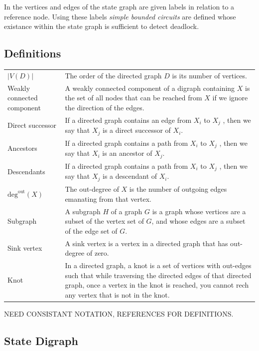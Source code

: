 \documentclass{article}
\begin{document}
In \cite{choetal95} the vertices and edges of the state graph are given labels in relation to a reference node.
Using these labels \textit{simple bounded circuits} are defined whose existance within the state graph is sufficient to detect deadlock.


\subsection{Definitions}

\begin{tabular}{ p{5cm} p{10cm} }
  $\left| V(D) \right|$        & The order of the directed graph $D$ is its number of vertices. \\
  Weakly connected component   & A weakly connected component of a digraph containing $X$ is the set of all nodes that can be reached from $X$ if we ignore the direction of the edges. \\
  Direct successor             & If a directed graph contains an edge from $X_i$ to $X_j$ , then we say that $X_j$ is a direct successor of $X_i$. \\
  Ancestors                    & If a directed graph contains a path from $X_i$ to $X_j$ , then we say that $X_i$ is an ancestor of $X_j$. \\
  Descendants                  & If a directed graph contains a path from $X_i$ to $X_j$ , then we say that $X_j$ is a descendant of $X_i$. \\
  $\text{deg}^{\text{out}}(X)$ & The out-degree of $X$ is the number of outgoing edges emanating from that vertex. \\
  Subgraph                     & A subgraph $H$ of a graph $G$ is a graph whose vertices are a subset of the vertex set of $G$, and whose edges are a subset of the edge set of $G$. \\
  Sink vertex                  & A sink vertex is a vertex in a directed graph that has out-degree of zero.\\
  Knot                         & In a directed graph, a knot is a set of vertices with out-edges such that while traversing the directed edges of that directed graph, once a vertex in the knot is reached, you cannot rech any vertex that is not in the knot.\\
\end{tabular}

NEED CONSISTANT NOTATION, REFERENCES FOR DEFINITIONS.

\subsection{State Digraph}
\end{document}
